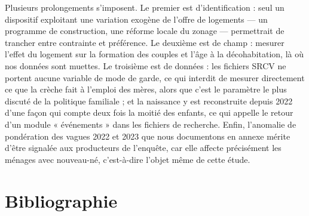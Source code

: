 \documentclass[12pt,a4paper]{article}
\begin{document}
\noindent Plusieurs prolongements s'imposent. Le premier est d'identification : seul un dispositif exploitant une variation exogène de l'offre de logements — un programme de construction, une réforme locale du zonage — permettrait de trancher entre contrainte et préférence. Le deuxième est de champ : mesurer l'effet du logement sur la formation des couples et l'âge à la décohabitation, là où nos données sont muettes. Le troisième est de données : les fichiers SRCV ne portent aucune variable de mode de garde, ce qui interdit de mesurer directement ce que la crèche fait à l'emploi des mères, alors que c'est le paramètre le plus discuté de la politique familiale ; et la naissance y est reconstruite depuis 2022 d'une façon qui compte deux fois la moitié des enfants, ce qui appelle le retour d'un module « événements » dans les fichiers de recherche. Enfin, l'anomalie de pondération des vagues 2022 et 2023 que nous documentons en annexe mérite d'être signalée aux producteurs de l'enquête, car elle affecte précisément les ménages avec nouveau-né, c'est-à-dire l'objet même de cette étude.
	
	\section*{Bibliographie}
	
\end{document}
